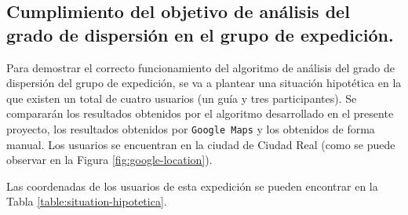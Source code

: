 \subsection{Cumplimiento del objetivo de análisis del grado de dispersión en el grupo de expedición.}

Para demostrar el correcto funcionamiento del algoritmo de análisis del grado de dispersión del grupo de expedición, se va a plantear una situación hipotética en la que existen un total de cuatro usuarios (un guía y tres participantes). Se compararán los resultados obtenidos por el algoritmo desarrollado en el presente proyecto, los resultados obtenidos por \texttt{Google Maps} y los obtenidos de forma manual. Los usuarios se encuentran en la ciudad de Ciudad Real (como se puede observar en la Figura \ref{fig:google-location}).

Las coordenadas de los usuarios de esta expedición se pueden encontrar en la Tabla \ref{table:situation-hipotetica}.

